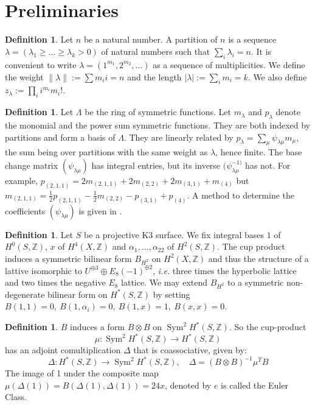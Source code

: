 \documentclass{amsart}
\DeclareMathOperator{\Sym}{Sym}
\newcommand{\ie}{{\it i.e. }}
\newcommand{\coloneqq}{:=}
\newcommand{\IZ}{\mathbb{Z}}
\theoremstyle{plain}
\theoremstyle{definition}
\newtheorem{definition}[theorem]{Definition}
\theoremstyle{remark}
\begin{document}
\section{Preliminaries}
\begin{definition}
Let $n$ be a natural number. A partition of $n$ is a sequence $\lambda = (\lambda_1\geq\ldots\geq\lambda_k>0)$ of natural numbers such that $\sum_i \lambda_i =n$. It is convenient to write $\lambda = (1^{m_1},2^{m_2},\ldots)$ as a sequence of multiplicities. We define the weight $\|\lambda\| :=\sum m_i i =n$ and the length $|\lambda| := \sum_i m_i =k$. We also define $z_\lambda \coloneqq\prod_i i^{m_i} m_i!$. 
\end{definition}
\begin{definition} \label{SymFun}
Let $\Lambda$ be the ring of symmetric functions. Let $m_\lambda$ and $p_\lambda$ denote the monomial and the power sum symmetric functions. They are both indexed by partitions and form a basis of $\Lambda$. They are linearly related by $p_\lambda = \sum_{\mu} \psi_{\lambda\mu}m_\mu$, the sum being over partitions with the same weight as $\lambda$, hence finite. The base change matrix $(\psi_{\lambda\mu})$ has integral entries, but its inverse $(\psi_{\lambda\mu}^{-1)}$ has not. For example, $p_{(2,1,1)} = 2m_{(2,1,1)} + 2m_{(2,2)}+2m_{(3,1)}+m_{(4)} $ but $ m_{(2,1,1)} = \frac{1}{2}p_{(2,1,1)} -\frac{1}{2}m_{(2,2)} -p_{(3,1)}+p_{(4)}$. A method to determine the coefficients $(\psi_{\lambda\mu})$ is given in \cite[Sect. 3.7]{Lascoux}.
\end{definition}
\begin{definition}
Let $S$ be a projective K3 surface. We fix integral bases $1$ of $H^0(S,\IZ)$, $x$ of $H^4(X,\IZ)$ and $\alpha_1,\ldots ,\alpha_{22}$ of $H^2(S,\IZ)$. The cup product induces a symmetric bilinear form $B_{H^2}$ on $H^2(X,\IZ)$ and thus the structure of a lattive isomorphic to $U^{\oplus 3}\oplus E_8(-1)^{\oplus 2}$, \ie three times the hyperbolic lattice and two times the negative $E_8$ lattice.
We may extend $B_{H^2}$ to a symmetric non-degenerate bilinear form on $H^\ast(S,\IZ)$ by setting $ B(1,1) = 0,\ B(1,\alpha_i) = 0,\ B(1,x) = 1, \ B(x,x) = 0$.
\end{definition}
\begin{definition}
$B$ induces a form $B\otimes B$ on $\Sym^2H^\ast(S,\IZ)$. So the cup-product 
\begin{equation*}
\mu : \Sym ^2H^{*}(S,\IZ) \longrightarrow H^\ast(S,\IZ) 
\end{equation*}
has an adjoint comultiplication $\Delta$ that is coassociative, given by:
\begin{equation*}
\Delta : H^\ast(S,\IZ) \longrightarrow \Sym^2H^\ast(S,\IZ),\quad \Delta = (B\otimes B)^{-1}\mu^TB
\end{equation*}
The image of 1 under the composite map $\mu(\Delta(1)) = B(\Delta(1),\Delta(1)) = 24 x$, denoted by $e$ is called the Euler Class.
\end{definition}
\end{document}
